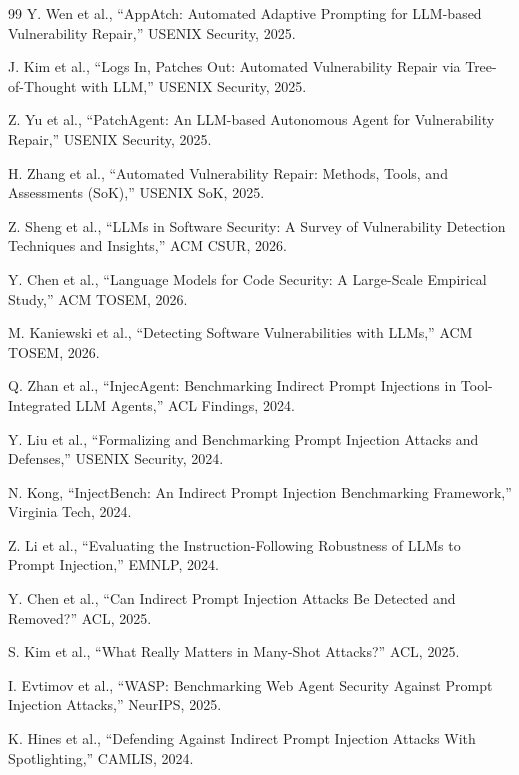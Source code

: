 \documentclass[11pt,a4paper,onecolumn]{article}
\begin{document}
\begin{thebibliography}{99}
Y. Wen et al., ``AppAtch: Automated Adaptive Prompting for LLM-based Vulnerability Repair,'' USENIX Security, 2025.

J. Kim et al., ``Logs In, Patches Out: Automated Vulnerability Repair via Tree-of-Thought with LLM,'' USENIX Security, 2025.

Z. Yu et al., ``PatchAgent: An LLM-based Autonomous Agent for Vulnerability Repair,'' USENIX Security, 2025.

H. Zhang et al., ``Automated Vulnerability Repair: Methods, Tools, and Assessments (SoK),'' USENIX SoK, 2025.

Z. Sheng et al., ``LLMs in Software Security: A Survey of Vulnerability Detection Techniques and Insights,'' ACM CSUR, 2026.

Y. Chen et al., ``Language Models for Code Security: A Large-Scale Empirical Study,'' ACM TOSEM, 2026.

M. Kaniewski et al., ``Detecting Software Vulnerabilities with LLMs,'' ACM TOSEM, 2026.


Q. Zhan et al., ``InjecAgent: Benchmarking Indirect Prompt Injections in Tool-Integrated LLM Agents,'' ACL Findings, 2024.

Y. Liu et al., ``Formalizing and Benchmarking Prompt Injection Attacks and Defenses,'' USENIX Security, 2024.

N. Kong, ``InjectBench: An Indirect Prompt Injection Benchmarking Framework,'' Virginia Tech, 2024.

Z. Li et al., ``Evaluating the Instruction-Following Robustness of LLMs to Prompt Injection,'' EMNLP, 2024.

Y. Chen et al., ``Can Indirect Prompt Injection Attacks Be Detected and Removed?'' ACL, 2025.

S. Kim et al., ``What Really Matters in Many-Shot Attacks?'' ACL, 2025.

I. Evtimov et al., ``WASP: Benchmarking Web Agent Security Against Prompt Injection Attacks,'' NeurIPS, 2025.

K. Hines et al., ``Defending Against Indirect Prompt Injection Attacks With Spotlighting,'' CAMLIS, 2024.


\end{thebibliography}
\end{document}
